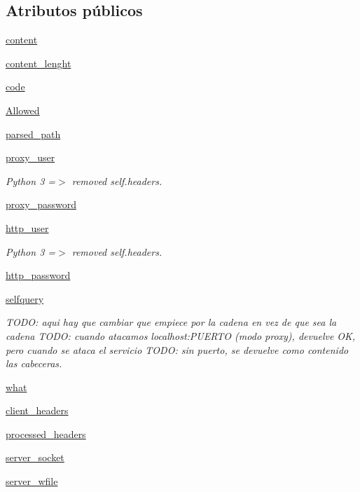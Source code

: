 \subsection*{Atributos públicos}
\begin{DoxyCompactItemize}
\item 
\hyperlink{class_proxy_1_1_proxy_a08a9034e04e2f83ab90d64595b5946b6}{content}
\item 
\hyperlink{class_proxy_1_1_proxy_aa22aa2049c12d112186e97e3e4649686}{content\-\_\-lenght}
\item 
\hyperlink{class_proxy_1_1_proxy_a8b14a11476e1a3b851ce385386590bd6}{code}
\item 
\hyperlink{class_proxy_1_1_proxy_abb25fa16c6d4a74eaf353de545a7f1ed}{Allowed}
\item 
\hyperlink{class_proxy_1_1_proxy_a7ff07ccd879fa486f5a51243ba65ca97}{parsed\-\_\-path}
\item 
\hyperlink{class_proxy_1_1_proxy_a6e94f2561fe165ea83cfd7871f78d847}{proxy\-\_\-user}
\begin{DoxyCompactList}\small\item\em Python 3 =$>$ removed self.\-headers. \end{DoxyCompactList}\item 
\hyperlink{class_proxy_1_1_proxy_a3a1b288bb4785d556eaf48f81a938f16}{proxy\-\_\-password}
\item 
\hyperlink{class_proxy_1_1_proxy_a4d932c725d9b809b5ba5dc56d7d3d5aa}{http\-\_\-user}
\begin{DoxyCompactList}\small\item\em Python 3 =$>$ removed self.\-headers. \end{DoxyCompactList}\item 
\hyperlink{class_proxy_1_1_proxy_adc00a281fb7111263639ffb60924877d}{http\-\_\-password}
\item 
\hyperlink{class_proxy_1_1_proxy_a69004ca892885efbc366741241b569a4}{selfquery}
\begin{DoxyCompactList}\small\item\em T\-O\-D\-O\-: aqui hay que cambiar que empiece por la cadena en vez de que sea la cadena T\-O\-D\-O\-: cuando atacamos localhost\-:P\-U\-E\-R\-T\-O (modo proxy), devuelve O\-K, pero cuando se ataca el servicio T\-O\-D\-O\-: sin puerto, se devuelve como contenido las cabeceras. \end{DoxyCompactList}\item 
\hyperlink{class_proxy_1_1_proxy_adf0eb725567f57446e803fdb9f665132}{what}
\item 
\hyperlink{class_proxy_1_1_proxy_ad923748d196f3f4cc70844214ae70e85}{client\-\_\-headers}
\item 
\hyperlink{class_proxy_1_1_proxy_a53d61e9b00af20aa42fcf1f8c5b3f2d9}{processed\-\_\-headers}
\item 
\hyperlink{class_proxy_1_1_proxy_aa0ad641288078cfa3c7ca4370e74859c}{server\-\_\-socket}
\item 
\hyperlink{class_proxy_1_1_proxy_abaa6decc509fa9749a7070681840e60f}{server\-\_\-wfile}
\end{DoxyCompactItemize}
